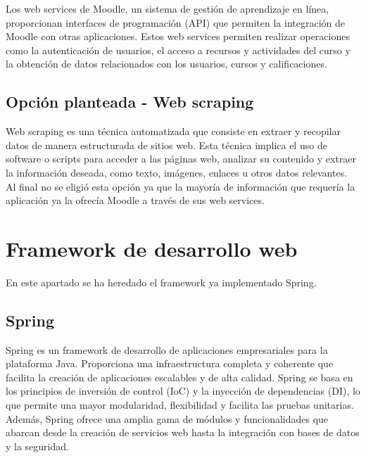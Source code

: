 Los web services de Moodle, un sistema de gestión de aprendizaje en línea, proporcionan interfaces de programación (API) que permiten la integración de Moodle con otras aplicaciones. Estos web services permiten realizar operaciones como la autenticación de usuarios, el acceso a recursos y actividades del curso y la obtención de datos relacionados con los usuarios, cursos y calificaciones.
\subsection{Opción planteada - Web scraping}
Web scraping es una técnica automatizada que consiste en extraer y recopilar datos de manera estructurada de sitios web. Esta técnica implica el uso de software o scripts para acceder a las páginas web, analizar su contenido y extraer la información deseada, como texto, imágenes, enlaces u otros datos relevantes.
Al final no se eligió esta opción ya que la mayoría de información que requería la aplicación ya la ofrecía Moodle a través de sus web services.

\section{Framework de desarrollo web}
En este apartado se ha heredado el framework ya implementado Spring.
\subsection{Spring}
Spring es un framework de desarrollo de aplicaciones empresariales para la plataforma Java. Proporciona una infraestructura completa y coherente que facilita la creación de aplicaciones escalables y de alta calidad. Spring se basa en los principios de inversión de control (IoC) y la inyección de dependencias (DI), lo que permite una mayor modularidad, flexibilidad y facilita las pruebas unitarias. Además, Spring ofrece una amplia gama de módulos y funcionalidades que abarcan desde la creación de servicios web hasta la integración con bases de datos y la seguridad.